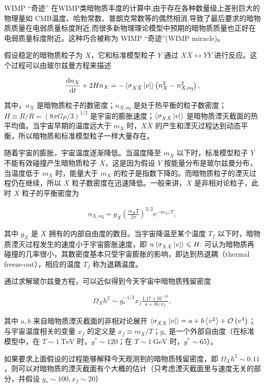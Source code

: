 \documentclass{beamer} %
\begin{document}
\begin{frame}{WIMP “奇迹”}
在WIMP类暗物质丰度的计算中,由于存在各种数量级上差别巨大的物理量如 CMB温度、哈勃常数、普朗克常数等的偶然相消,导致了最后要求的暗物质质量在电弱质量标度附近,而很多新物理理论模型中预期的暗物质质量也正好在电弱质量标度附近。这种巧合被称为 WIMP “奇迹”(WIMP miracle)。

假设稳定的暗物质粒子为 $X$，它和标准模型粒子 $Y$ 通过 $X\bar{X} \leftrightarrow Y\bar{Y}$ 进行反应。这个过程可以由玻尔兹曼方程来描述

\begin{align}
\frac{\mathrm{d}n_X }{\mathrm{d}t } + 2 H n_X 
=-\braket{\sigma_{X\bar{X}}\left|v \right|} \left(n_X^2 - n_{X,\mathrm{eq}}^2 \right),
\end{align}

其中，$n_X$ 是暗物质粒子的数密度；$n_{X,\mathrm{eq}}$ 是处于热平衡的粒子数密度；$H\equiv \dot{R}/R=\left(8\pi G \rho/3 \right)^{1/2}$ 是宇宙的膨胀速度；$\braket{\sigma_{X\bar{X}}\left|v \right|}$ 是暗物质湮灭截面的热平均值。当宇宙早期的温度远大于 $m_X$ 时，$X\bar{X}$ 的产生和湮灭过程达到动态平衡，所以暗物质和标准模型粒子一样大量存在。
\end{frame}

\begin{frame}
随着宇宙的膨胀，宇宙温度逐渐降低。当温度降至 $m_X$ 以下时，标准模型粒子 $Y$ 不能有效碰撞产生暗物质粒子 $X$，这是因为假设 $Y$ 按能量分布是玻尔兹曼分布，当温度低于 $m_X$ 时，能量大于 $m_X$ 的粒子是指数下降的。而暗物质粒子的湮灭过程仍在继续，所以 $X$ 粒子数密度在迅速降低。一般来讲，$X$ 是非相对论粒子，此时 $X$ 粒子的平衡密度为

\begin{align}
n_{X,\mathrm{eq}}
=g_X \left(\frac{m_X T}{2\pi }  \right)^{3/2} \mathrm{e}^{-m_X/T},
\end{align}

其中 $g_X$ 是 $X$ 拥有的内部自由度的数目。当宇宙降温至某个温度 $T_f$ 以下时，暗物质湮灭过程发生的速度小于宇宙膨胀速度，即 $n \Braket{\sigma_{X\bar{X}}\left|v \right|} \leqslant H .$ 可认为暗物质再碰撞的几率很小，其数密度基本只受宇宙膨胀的影响，即达到热退耦（thermal freeze-out），相应的温度 $T_f$ 称为退耦温度。
\end{frame}

\begin{frame}
通过求解玻尔兹曼方程，可以近似得到今天宇宙中暗物质残留密度

\begin{align}
\Omega_X h^2 \sim g_*^{-1/2} x_f \frac{1.17\times 10^{-10} }{a+3b/x_f }, 
\end{align}

其中 $a,b$ 来自暗物质湮灭截面的非相对论展开 $\Braket{\sigma_{\bar{X}X}\left|v \right|}=a+b\Braket{v^2}+\mathcal{O}\left(v^4 \right)$；与宇宙温度相关的变量 $x_f$ 的定义是 $x_f\equiv m_X/T$；$g_*$ 是一个外部自由度（在标准模型中，在 $T\sim 1~\mathrm{TeV}$ 时，$g^*\sim 120$；在 $T\sim 1~\mathrm{GeV}$ 时，$g^*\sim 65$）。

如果要求上面假设的过程能够解释今天观测到的暗物质残留密度，即 $\Omega_X h^2 \sim 0.11$，则可以对暗物质的湮灭截面有个大概的估计（只考虑湮灭截面里与速度无关的部分，并假设 $g_*\sim 100,x_f\sim 20$）
\end{frame}
\end{document}

